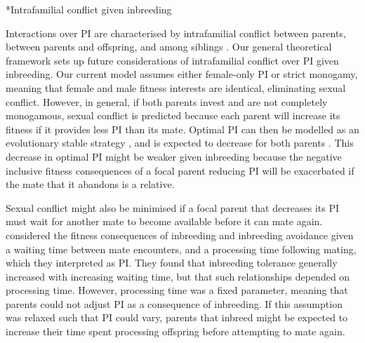 \documentclass[12pt]{article}
\makeatletter
\renewcommand\subsection{\@startsection{subsection}{1}{-0.25in}{-0.5\baselineskip}{0.1\baselineskip}{\normalfont\normalsize\bfseries\textit}}
\makeatother
\begin{document}
\subsection*{Intrafamilial conflict given inbreeding}

Interactions over PI are characterised by intrafamilial conflict between parents, between parents and offspring, and among siblings \cite[][]{Parker2002}. Our general theoretical framework sets up future considerations of intrafamilial conflict over PI given inbreeding. Our current model assumes either female-only PI or strict monogamy, meaning that female and male fitness interests are identical, eliminating sexual conflict. However, in general, if both parents invest and are not completely monogamous, sexual conflict is predicted because each parent will increase its fitness if it provides less PI than its mate. Optimal PI can then be modelled as an evolutionary stable strategy \cite[][]{Smith1977}, and is expected to decrease for both parents \cite[][]{Parker1985}. This decrease in optimal PI might be weaker given inbreeding because the negative inclusive fitness consequences of a focal parent reducing PI will be exacerbated if the mate that it abandons is a relative. 

Sexual conflict might also be minimised if a focal parent that decreases its PI must wait for another mate to become available before it can mate again. \cite{Kokko2006} considered the fitness consequences of inbreeding and inbreeding avoidance given a waiting time between mate encounters, and a processing time following mating, which they interpreted as PI. They found that inbreeding tolerance generally increased with increasing waiting time, but that such relationships depended on processing time.  However, processing time was a fixed parameter, meaning that parents could not adjust PI as a consequence of inbreeding. If this assumption was relaxed such that PI could vary, parents that inbreed might be expected to increase their time spent processing offspring before attempting to mate again.
\end{document}
